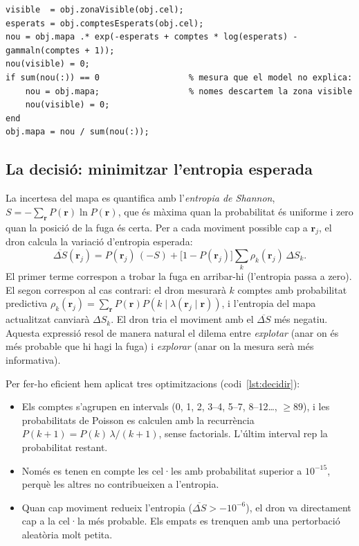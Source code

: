\documentclass[11pt,a4paper]{article}
\begin{document}
\begin{lstlisting}[caption={Actualització bayesiana (part de \texttt{Dron.infotaxisActualitzar}).}, label=lst:bayes]
visible  = obj.zonaVisible(obj.cel);
esperats = obj.comptesEsperats(obj.cel);
nou = obj.mapa .* exp(-esperats + comptes * log(esperats) - gammaln(comptes + 1));
nou(visible) = 0;
if sum(nou(:)) == 0                  % mesura que el model no explica:
    nou = obj.mapa;                  % nomes descartem la zona visible
    nou(visible) = 0;
end
obj.mapa = nou / sum(nou(:));
\end{lstlisting}

\subsection{La decisió: minimitzar l'entropia esperada}

La incertesa del mapa es quantifica amb l'\emph{entropia de Shannon}, $S = -\sum_{\mathbf{r}} P(\mathbf{r}) \ln P(\mathbf{r})$, que és màxima quan la probabilitat és uniforme i zero quan la posició de la fuga és certa. Per a cada moviment possible cap a $\mathbf{r}_j$, el dron calcula la variació d'entropia esperada:
\begin{equation}
\overline{\Delta S}(\mathbf{r}_j) = P(\mathbf{r}_j)\,(-S) + \big[1 - P(\mathbf{r}_j)\big] \sum_k \rho_k(\mathbf{r}_j)\, \Delta S_k.
\end{equation}
El primer terme correspon a trobar la fuga en arribar-hi (l'entropia passa a zero). El segon correspon al cas contrari: el dron mesurarà $k$ comptes amb probabilitat predictiva $\rho_k(\mathbf{r}_j) = \sum_{\mathbf{r}} P(\mathbf{r}) P(k \mid \lambda(\mathbf{r}_j \mid \mathbf{r}))$, i l'entropia del mapa actualitzat canviarà $\Delta S_k$. El dron tria el moviment amb el $\overline{\Delta S}$ més negatiu. Aquesta expressió resol de manera natural el dilema entre \emph{explotar} (anar on és més probable que hi hagi la fuga) i \emph{explorar} (anar on la mesura serà més informativa).

Per fer-ho eficient hem aplicat tres optimitzacions (codi~\ref{lst:decidir}):
\begin{itemize}
\item Els comptes s'agrupen en intervals (0, 1, 2, 3--4, 5--7, 8--12\ldots, $\geq 89$), i les probabilitats de Poisson es calculen amb la recurrència $P(k+1) = P(k)\,\lambda/(k+1)$, sense factorials. L'últim interval rep la probabilitat restant.
\item Només es tenen en compte les cel·les amb probabilitat superior a $10^{-15}$, perquè les altres no contribueixen a l'entropia.
\item Quan cap moviment redueix l'entropia ($\overline{\Delta S} > -10^{-6}$), el dron va directament cap a la cel·la més probable. Els empats es trenquen amb una pertorbació aleatòria molt petita.
\end{itemize}
\end{document}
